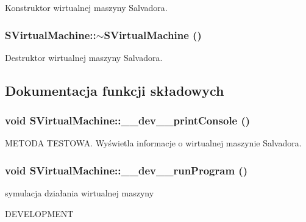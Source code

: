 Konstruktor wirtualnej maszyny Salvadora. \hypertarget{classSVirtualMachine_eb727bcfdf05d45526920aa512988249}{
\subsubsection[{$\sim$SVirtualMachine}]{\setlength{\rightskip}{0pt plus 5cm}SVirtualMachine::$\sim$SVirtualMachine ()}}
\label{classSVirtualMachine_eb727bcfdf05d45526920aa512988249}


Destruktor wirtualnej maszyny Salvadora. 

\subsection{Dokumentacja funkcji składowych}
\hypertarget{classSVirtualMachine_21b1ac24c7018fd084a553a66f5827ea}{
\subsubsection[{\_\-\_\-dev\_\-\_\-printConsole}]{\setlength{\rightskip}{0pt plus 5cm}void SVirtualMachine::\_\-\_\-dev\_\-\_\-printConsole ()}}
\label{classSVirtualMachine_21b1ac24c7018fd084a553a66f5827ea}


METODA TESTOWA. Wyświetla informacje o wirtualnej maszynie Salvadora. \hypertarget{classSVirtualMachine_d07f353daaf626f5efeb8bd34818db75}{
\subsubsection[{\_\-\_\-dev\_\-\_\-runProgram}]{\setlength{\rightskip}{0pt plus 5cm}void SVirtualMachine::\_\-\_\-dev\_\-\_\-runProgram ()}}
\label{classSVirtualMachine_d07f353daaf626f5efeb8bd34818db75}


symulacja działania wirtualnej maszyny 

DEVELOPMENT

